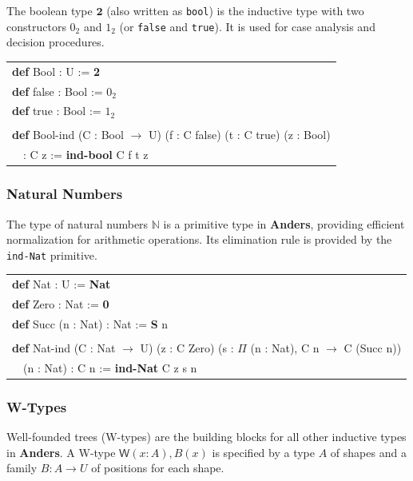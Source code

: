\documentclass[a4paper,UKenglish,cleveref, autoref, thm-restate]{lipics-v2021}
\newcommand{\tabstyle}[0]{\scriptsize\ttfamily\fontseries{l}\selectfont}
\newcommand{\anders}[0]{\textbf{Anders}}
\begin{document}
The boolean type $\mathbf{2}$ (also written as \texttt{bool}) is the inductive type with two constructors $0_2$ and $1_2$ (or \texttt{false} and \texttt{true}). It is used for case analysis and decision procedures.

\begin{table}[ht!]
\tabstyle
\begin{tabular}{l}
\textbf{def} Bool : U := \textbf{2} \\
\textbf{def} false : Bool := $0_2$ \\
\textbf{def} true : Bool := $1_2$ \\
\\
\textbf{def} Bool-ind (C : Bool $\rightarrow$ U) (f : C false) (t : C true) (z : Bool) \\
\ \ : C z := \textbf{ind-bool} C f t z
\end{tabular}
\end{table}

\newpage
\subsubsection*{Natural Numbers}

The type of natural numbers $\mathbb{N}$ is a primitive type in \anders, providing efficient normalization for arithmetic operations. Its elimination rule is provided by the \texttt{ind-Nat} primitive.

\begin{table}[ht!]
\tabstyle
\begin{tabular}{l}
\textbf{def} Nat : U := \textbf{Nat} \\
\textbf{def} Zero : Nat := \textbf{0} \\
\textbf{def} Succ (n : Nat) : Nat := \textbf{S} n \\
\\
\textbf{def} Nat-ind (C : Nat $\rightarrow$ U) (z : C Zero) (s : $\Pi$ (n : Nat), C n $\rightarrow$ C (Succ n)) \\
\ \ (n : Nat) : C n := \textbf{ind-Nat} C z s n
\end{tabular}
\end{table}

\subsubsection*{W-Types}

Well-founded trees (W-types) are the building blocks for all other inductive types in \anders. A W-type $\mathsf{W}(x : A), B(x)$ is specified by a type $A$ of shapes and a family $B : A \to U$ of positions for each shape.
\end{document}
